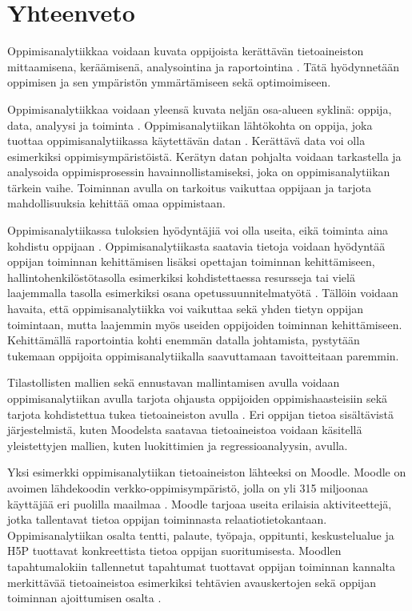 \chapter{Yhteenveto\label{yhteenveto}}

Oppimisanalytiikkaa voidaan kuvata oppijoista kerättävän tietoaineiston mittaamisena, keräämisenä, analysointina ja raportointina \citep{siemensLearningAnalyticsEmergence2013,clowLearningAnalyticsCycle2012}. Tätä hyödynnetään oppimisen ja sen ympäristön ymmärtämiseen sekä optimoimiseen.

Oppimisanalytiikkaa voidaan yleensä kuvata neljän osa-alueen syklinä: oppija, data, analyysi ja toiminta \citep{clowLearningAnalyticsCycle2012}. Oppimisanalytiikan lähtökohta on oppija, joka tuottaa oppimisanalytiikassa käytettävän datan \citep{wolffImprovingRetentionPredicting2013}. Kerättävä data voi olla esimerkiksi oppimisympäristöistä. Kerätyn datan pohjalta voidaan tarkastella ja analysoida oppimisprosessin havainnollistamiseksi, joka on oppimisanalytiikan tärkein vaihe. Toiminnan avulla on tarkoitus vaikuttaa oppijaan ja tarjota mahdollisuuksia kehittää omaa oppimistaan.

Oppimisanalytiikassa tuloksien hyödyntäjiä voi olla useita, eikä toiminta aina kohdistu oppijaan \citep{clowLearningAnalyticsCycle2012}. Oppimisanalytiikasta saatavia tietoja voidaan hyödyntää oppijan toiminnan kehittämisen lisäksi opettajan toiminnan kehittämiseen, hallintohenkilöstötasolla esimerkiksi kohdistettaessa resursseja tai vielä laajemmalla tasolla esimerkiksi osana opetussuunnitelmatyötä \citep{clowOverviewLearningAnalytics2013}. Tällöin voidaan havaita, että oppimisanalytiikka voi vaikuttaa sekä yhden tietyn oppijan toimintaan, mutta laajemmin myös useiden oppijoiden toiminnan kehittämiseen. Kehittämällä raportointia kohti enemmän datalla johtamista, pystytään tukemaan oppijoita oppimisanalytiikalla saavuttamaan tavoitteitaan paremmin.

Tilastollisten mallien sekä ennustavan mallintamisen avulla voidaan oppimisanalytiikan avulla tarjota ohjausta oppijoiden oppimishaasteisiin sekä tarjota kohdistettua tukea tietoaineiston avulla \citep{ranjeethSurveyPredictiveModels2020}. Eri oppijan tietoa sisältävistä järjestelmistä, kuten Moodelsta saatavaa tietoaineistoa voidaan käsitellä yleistettyjen mallien, kuten luokittimien ja regressioanalyysin, avulla.

Yksi esimerkki oppimisanalytiikan tietoaineiston lähteeksi on Moodle. Moodle on avoimen lähdekoodin verkko-oppimisympäristö, jolla on yli 315 miljoonaa käyttäjää eri puolilla maailmaa \citep{dougiamasPowerOpenEducational2021,dougiamasMoodle2022,moodle.orgMoodleStatistics}. Moodle tarjoaa useita erilaisia aktiviteettejä, jotka tallentavat tietoa oppijan toiminnasta relaatiotietokantaan. Oppimisanalytiikan osalta tentti, palaute, työpaja, oppitunti, keskustelualue ja H5P tuottavat konkreettista tietoa oppijan suoritumisesta. Moodlen tapahtumalokiin tallennetut tapahtumat tuottavat oppijan toiminnan kannalta merkittävää tietoaineistoa esimerkiksi tehtävien avauskertojen sekä oppijan toiminnan ajoittumisen osalta \citep{dougiamasLoggingMoodleDocs2021, abdullahLearningStyleClassification2015}.

